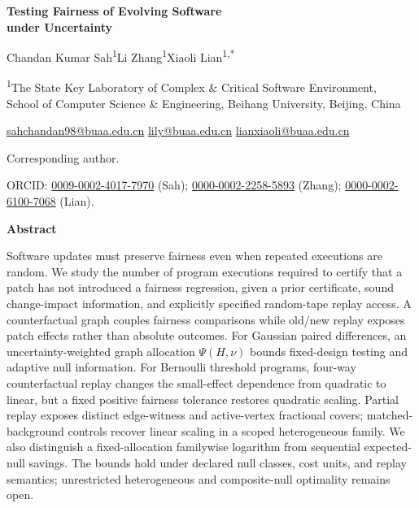 \begin{titlepage}
\centering
\vspace*{0.5in}
{\LARGE\bfseries Testing Fairness of Evolving Software\\[4pt] under Uncertainty\par}
\vspace{0.6in}
{\large Chandan Kumar Sah\textsuperscript{1}\quad Li Zhang\textsuperscript{1}\quad Xiaoli Lian\textsuperscript{1,*}\par}
\vspace{0.22in}
{\normalsize\textsuperscript{1}The State Key Laboratory of Complex \& Critical Software Environment,\\
School of Computer Science \& Engineering, Beihang University, Beijing, China\par}
\vspace{0.12in}
{\normalsize \href{mailto:sahchandan98@buaa.edu.cn}{sahchandan98@buaa.edu.cn}\quad
\href{mailto:lily@buaa.edu.cn}{lily@buaa.edu.cn}\quad
\href{mailto:lianxiaoli@buaa.edu.cn}{lianxiaoli@buaa.edu.cn}\par}
{\normalsize *Corresponding author.\par}
\vspace{0.15in}
{\normalsize ORCID: \href{https://orcid.org/0009-0002-4017-7970}{0009-0002-4017-7970} (Sah); \href{https://orcid.org/0000-0002-2258-5893}{0000-0002-2258-5893} (Zhang); \href{https://orcid.org/0000-0002-6100-7068}{0000-0002-6100-7068} (Lian).\par}
\vspace{0.55in}
\begin{minipage}{0.92\textwidth}
\begin{center}{\large\bfseries Abstract}\end{center}
Software updates must preserve fairness even when repeated executions are random. We study the number of program executions required to certify that a patch has not introduced a fairness regression, given a prior certificate, sound change-impact information, and explicitly specified random-tape replay access. A counterfactual graph couples fairness comparisons while old/new replay exposes patch effects rather than absolute outcomes.
For Gaussian paired differences, an uncertainty-weighted graph allocation $\Psi(H,\nu)$ bounds fixed-design testing and adaptive null information. For Bernoulli threshold programs, four-way counterfactual replay changes the small-effect dependence from quadratic to linear, but a fixed positive fairness tolerance restores quadratic scaling. Partial replay exposes distinct edge-witness and active-vertex fractional covers; matched-background controls recover linear scaling in a scoped heterogeneous family. We also distinguish a fixed-allocation familywise logarithm from sequential expected-null savings. The bounds hold under declared null classes, cost units, and replay semantics; unrestricted heterogeneous and composite-null optimality remains open.

\end{minipage}
\end{titlepage}
